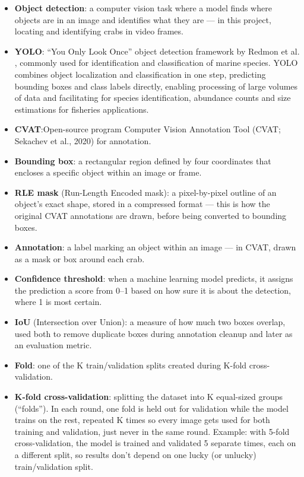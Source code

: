\documentclass[
]{book}
\providecommand{\tightlist}{%
  \setlength{\itemsep}{0pt}\setlength{\parskip}{0pt}}
\begin{document}
\begin{itemize}
\tightlist
\item
  \textbf{Object detection}: a computer vision task where a model finds where objects are in an image and identifies what they are --- in this project, locating and identifying crabs in video frames.
\item
  \textbf{YOLO}: ``You Only Look Once'' object detection framework by Redmon et al. \citeyearpar{redmon_you_2016}, commonly used for identification and classification of marine species. YOLO combines object localization and classification in one step, predicting bounding boxes and class labels directly, enabling processing of large volumes of data and facilitating for species identification, abundance counts and size estimations for fisheries applications.
\item
  \textbf{CVAT}:Open-source program Computer Vision Annotation Tool (CVAT; Sekachev et al., 2020) for annotation.
\item
  \textbf{Bounding box}: a rectangular region defined by four coordinates that encloses a specific object within an image or frame.
\item
  \textbf{RLE mask} (Run-Length Encoded mask): a pixel-by-pixel outline of an object's exact shape, stored in a compressed format --- this is how the original CVAT annotations are drawn, before being converted to bounding boxes.
\item
  \textbf{Annotation}: a label marking an object within an image --- in CVAT, drawn as a mask or box around each crab.
\item
  \textbf{Confidence threshold}: when a machine learning model predicts, it assigns the prediction a score from 0--1 based on how sure it is about the detection, where 1 is most certain.
\item
  \textbf{IoU} (Intersection over Union): a measure of how much two boxes overlap, used both to remove duplicate boxes during annotation cleanup and later as an evaluation metric.
\item
  \textbf{Fold}: one of the K train/validation splits created during K-fold cross-validation.
\item
  \textbf{K-fold cross-validation}: splitting the dataset into K equal-sized groups (``folds''). In each round, one fold is held out for validation while the model trains on the rest, repeated K times so every image gets used for both training and validation, just never in the same round. Example: with 5-fold cross-validation, the model is trained and validated 5 separate times, each on a different split, so results don't depend on one lucky (or unlucky) train/validation split.

\end{itemize}
\end{document}
